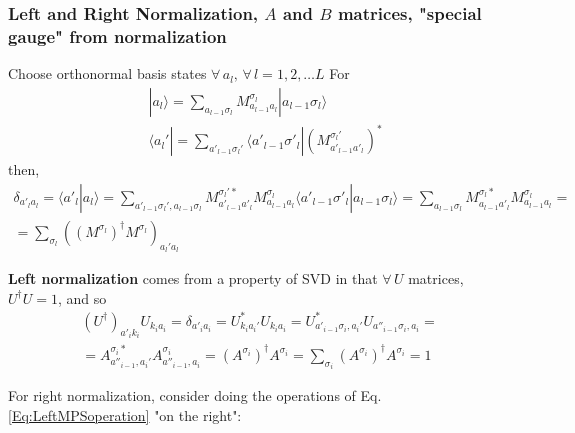 \documentclass[10pt]{amsart}
\begin{document}
\begin{multicols*}{2}

\subsubsection{Left and Right Normalization, $A$ and $B$ matrices, "special gauge" from normalization}

Choose orthonormal basis states $\forall \, a_l, \, \forall \, l = 1, 2, \dots L$
For
\[
\begin{aligned}
& | a_l \rangle = \sum_{ a_{l-1} \sigma_l } M^{\sigma_l}_{a_{l-1}a_l } | a_{l-1} \sigma_l \rangle \\
& \langle a_l' | = \sum_{a'_{l-1} \sigma_l'} \langle a'_{l-1} \sigma'_l | (M^{\sigma_l'}_{a'_{l-1} a'_l})^*
\end{aligned}
\]
then,
\begin{equation}
\begin{gathered}
\delta_{a'_l a_l} = \langle a'_l | a_l \rangle = \sum_{a'_{l-1}\sigma_l', a_{l-1}\sigma_l } M^{\sigma_l' *}_{a'_{l-1} a'_l} M^{\sigma_l}_{a_{l-1} a_l} \langle a'_{l-1} \sigma'_l | a_{l-1} \sigma_l \rangle = \sum_{a_{l-1} \sigma_l } M^{\sigma_l *}_{a_{l-1} a'_l} M^{\sigma_l}_{a_{l-1} a_l} = \\
= \sum_{\sigma_l} ( (M^{\sigma_l})^{\dag} M^{\sigma_l})_{a_l' a_l}
\end{gathered}
\end{equation}

\textbf{Left normalization} comes from a property of SVD in that $\forall \, U$ matrices, $U^{\dagger} U =1$, and so 
\begin{equation}
\begin{gathered}
(U^{\dagger})_{a'_i k_i} U_{k_i a_i} =  \delta_{a'_i a_i} = U^*_{ k_i a_i'} U_{k_i a_i} = U^*_{a'_{i-1} \sigma_i, a_i'} U_{a''_{i-1}\sigma_i, a_i} = \\ 
= A^{\sigma_i *}_{a''_{i-1}, a_i'} A^{\sigma_i}_{a''_{i-1}, a_i} = (A^{\sigma_i})^{\dagger} A^{\sigma_i} = \boxed{ \sum_{\sigma_i} (A^{\sigma_i})^{\dagger} A^{\sigma_i} = 1 }
\end{gathered}
\end{equation}

For right normalization, consider doing the operations of Eq. \ref{Eq:LeftMPSoperation} "on the right":


\end{multicols*}
\end{document}

